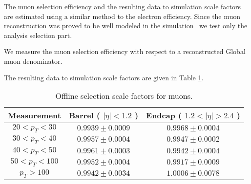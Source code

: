 
The muon selection efficiency and the resulting data to simulation
scale factors are estimated using a similar method to the electron efficiency.
Since the muon reconstruction was proved to be well modeled in the simulation~\cite{VBTFCrossSectionNote}
we test only the analysis selection part.

We measure the muon selection efficiency with respect to a reconstructed Global muon
denominator.

The resulting data to simulation scale factors are given in Table \ref{tab:eff_mu_offline}.

\begin{table}[!ht]
\begin{center}
\begin{tabular}{c|c|c}
\hline
Measurement & Barrel ( $|\eta|<1.2$ )   & Endcap ( $1.2<|\eta|>2.4$ )  \\ 
\hline
$20 < p_T < 30$  & $0.9939 \pm 0.0009$ & $0.9968 \pm 0.0004$  \\ \hline
$30 < p_T < 40$  & $0.9957 \pm 0.0004$ & $0.9947 \pm 0.0002$  \\ \hline
$40 < p_T < 50$  & $0.9961 \pm 0.0003$ & $0.9942 \pm 0.0004$  \\ \hline
$50 < p_T < 100$ & $0.9952 \pm 0.0004$ & $0.9917 \pm 0.0009$  \\ \hline
$p_T > 100$      & $0.9942 \pm 0.0034$ & $1.0006 \pm 0.0078$  \\ \hline 
\end{tabular}
\caption{Offline selection scale factors for muons.}
\label{tab:eff_mu_offline}
\end{center}
\end{table}


